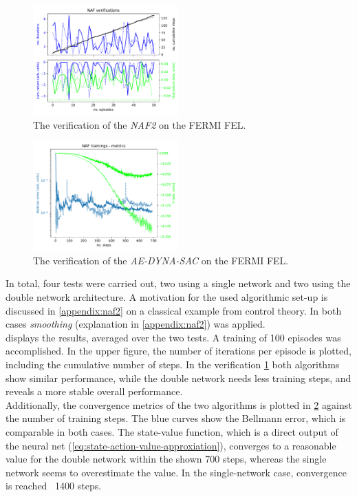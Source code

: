 \documentclass[
reprint,
amsmath,amssymb,amsfonts,clevref,
aps,
prstab,
]{revtex4-2}
\begin{document}
	\begin{figure}[!h]
		\centering
		\includegraphics*[width=0.5\textwidth]{Figures/FERMI_all_experiments_NAF_verification_episodes.pdf}
		\caption{The verification of the \emph{NAF2} on the FERMI FEL.}
		\label{fig:NAF_verification}
	\end{figure}
	
	\begin{figure}[!h]
		\centering
		\includegraphics*[width=0.5\textwidth]{Figures/FERMI_all_experiments_NAF_convergence.pdf}
		\caption{The verification of the \emph{AE-DYNA-SAC} on the FERMI FEL.}
		\label{fig:NAF_convergence}
	\end{figure}
	In total, four tests were carried out, two using a single network and two using the double network architecture. A motivation for the used algorithmic set-up is discussed in \cref{appendix:naf2} on a classical example from control theory. In both cases \emph{smoothing} (explanation in \cref{appendix:naf2}) was applied.\\
	 displays the results, averaged over the two tests. A training of 100 episodes was accomplished. In the upper figure, the number of iterations per episode is plotted, including the cumulative number of steps.
	In the verification \cref{fig:NAF_verification} both algorithms show similar performance, while the double network needs less training steps, and reveals a more stable overall performance.\\
	Additionally, the convergence metrics of the two algorithms is plotted in \cref{fig:NAF_convergence} against the number of training steps. The blue curves show the Bellmann error, which is comparable in both cases. The state-value function, which is a direct output of the neural net (\cref{eq:state-action-value-approxiation}), converges to a reasonable value for the double network within the shown 700 steps, whereas the single network seems to overestimate the value. In the single-network case, convergence is reached ~1400 steps.\\
\end{document}
